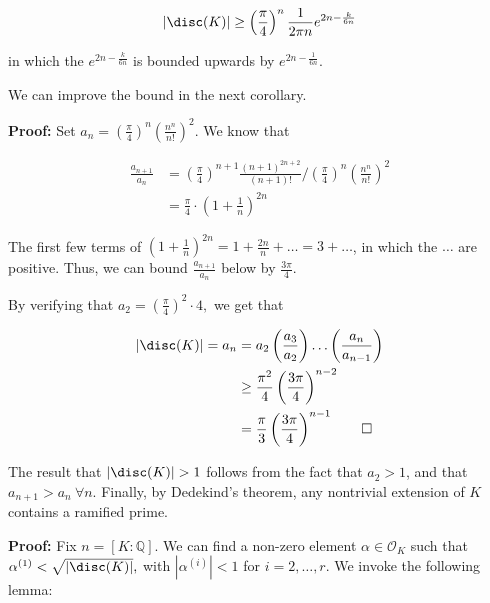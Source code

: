 \documentclass[a4paper, 12pt,oneside,openany]{book}
\begin{document}
\begin{equation}
    |\disc(K)| \geq \left(\frac{\pi}{4}\right)^{n}\frac{1}{2\pi n} e^{2n-\frac{k}{6n}} \label{eqn1.4}
\end{equation}

in which the $e^{2n-\frac{k}{6n}}$ is bounded upwards by $e^{2n-\frac{1}{6n}}.$

We can improve the bound in the next corollary.


\textbf{Proof:} Set $a_n = \left(\frac{\pi}{4}\right)^n\left(\frac{n^n}{n!}\right)^2.$ We know that 

\begin{align*}
    \frac{a_{n+1}}{a_n}&=\left(\frac{\pi}{4}\right)^{n+1}\frac{(n+1)^{2n+2}}{(n+1)!} / \left(\frac{\pi}{4}\right)^n\left(\frac{n^n}{n!}\right)^2 \\
    &= \frac{\pi}{4} \cdot \left(1+\frac{1}{n}\right)^{2n}
\end{align*}

The first few terms of $\left(1+\frac{1}{n}\right)^{2n}=1+\frac{2n}{n}+\dots=3+\dots$, in which the $\dots$ are positive. Thus, we can bound $\frac{a_{n+1}}{a_n}$ below by $\frac{3\pi}{4}.$

By verifying that $a_2=(\frac{\pi}{4})^2\cdot 4,$ we get that 

\begin{align*}
    |\disc(K)|=a_{n} &= a_2 \left(\frac{a_3}{a_2}\right)  \dots \left(\frac{a_n}{a_{n-1}}\right) \\
    &\geq \frac{\pi^2}{4}\left(\frac{3\pi}{4}\right)^{n-2}\\
    &= \frac{\pi}{3}\left(\frac{3\pi}{4}\right)^{n-1}\qed
\end{align*}

The result that $|\disc(K)|>1$ follows from the fact that $a_2 > 1$, and that $a_{n+1} > a_n\ \forall n.$ Finally, by Dedekind's theorem, any nontrivial extension of $K$ contains a ramified prime. 


\textbf{Proof:} Fix $n=[K:\mathbb{Q}].$ We can find a non-zero element $\alpha \in \mathcal{O}_K$ such that $\alpha^{(1)}<\sqrt{|\disc(K)|},$ with $|\alpha^{(i)}| <1$ for $i=2, \dots, r.$ We invoke the following lemma:
\end{document}
